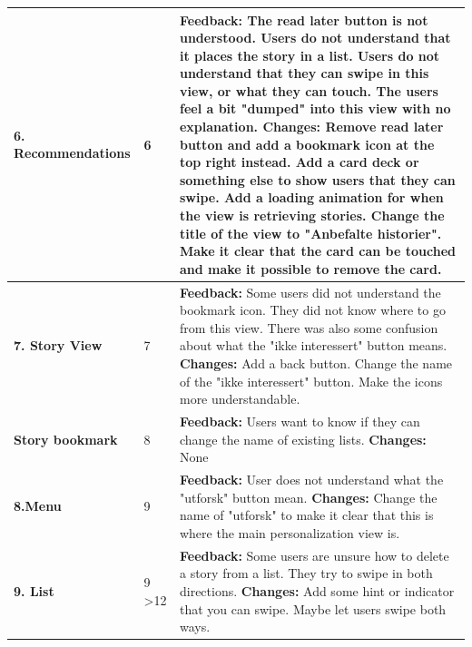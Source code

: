 \begin{appendices}
\begin{center}
\begin{longtable}{ | p{2cm} | p{1cm} | p{13cm}|}
		\textbf{6. Recommendations} & 6 & 
		\textbf{Feedback:} The read later button is not understood. Users do not understand that it places the story in a list. Users do not understand that they can swipe in this view, or what they can touch. The users feel a bit "dumped" into this view with no explanation.\newline
		\textbf{Changes:} Remove read later button and add a bookmark icon at the top right instead. Add a card deck or something else to show users that they can swipe. Add a loading animation for when the view is retrieving stories. Change the title of the view to "Anbefalte historier". Make it clear that the card can be touched and make it possible to remove the card.
		\\\hline
		
		\textbf{7. Story View} & 7 & 
		\textbf{Feedback:} Some users did not understand the bookmark icon. They did not know where to go from this view. There was also some confusion about what the "ikke interessert" button means.\newline 
		\textbf{Changes:} Add a back button. Change the name of the "ikke interessert" button. Make the icons more understandable.
		\\\hline
		
		\textbf{Story bookmark} & 8  & 
		\textbf{Feedback:} Users want to know if they can change the name of existing lists.\newline
		\textbf{Changes:} None	
		\\\hline
		
		\textbf{8.Menu} & 9  &
		\textbf{Feedback:} User does not understand what the "utforsk" button mean.\newline
		\textbf{Changes:} Change the name of "utforsk" to make it clear that this is where the main personalization view is.		
		\\\hline
		
		\textbf{9. List} & 9 \textgreater 12 &
		\textbf{Feedback:} Some users are unsure how to delete a story from a list. They try to swipe in both directions.\newline
		\textbf{Changes:} Add some hint or indicator that you can swipe. Maybe let users swipe both ways.
		\\\hline
	\end{longtable}
\end{center}


\end{appendices}
